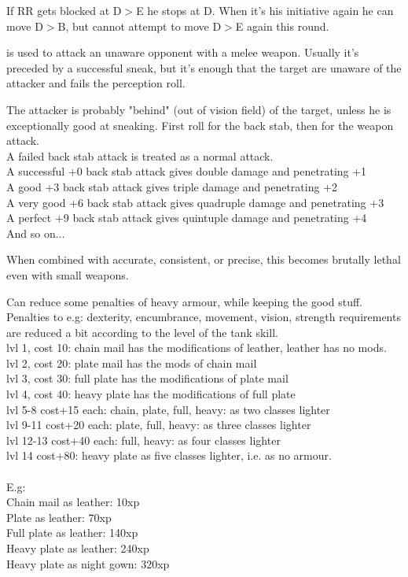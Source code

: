 If RR gets blocked at D$>$E he stops at D. When it's his initiative again he can move D$>$B, but cannot attempt to move D$>$E again this round.


 is used to attack an unaware opponent with a melee weapon. Usually it's preceded by a successful sneak, but it's enough that the target are unaware of the attacker and fails the perception roll.

The attacker is probably "behind" (out of vision field) of the target, unless he is exceptionally good at sneaking. First roll for the back stab, then for the weapon attack.\\ %
A failed back stab attack is treated as a normal attack.\\
A successful +0 back stab attack gives double damage and penetrating +1 \\
A good +3 back stab attack gives triple damage and penetrating +2 \\
A very good +6 back stab attack gives quadruple damage and penetrating +3 \\
A perfect +9 back stab attack gives quintuple damage and penetrating +4 \\
And so on...

When combined with accurate, consistent, or precise, this becomes brutally lethal even with small weapons.


 Can reduce some penalties of heavy armour, while keeping the good stuff. Penalties to e.g: dexterity, encumbrance, movement, vision, strength requirements are reduced a bit according to the level of the tank skill.\\
lvl 1, cost 10: chain mail has the modifications of leather, leather has no mods. \\
lvl 2, cost 20: plate mail has the mods of chain mail \\
lvl 3, cost 30: full plate has the modifications of plate mail \\
lvl 4, cost 40: heavy plate has the modifications of full plate \\
lvl 5-8 cost+15 each: chain, plate, full, heavy: as two classes lighter \\
lvl 9-11 cost+20 each: plate, full, heavy: as three classes lighter \\
lvl 12-13 cost+40 each: full, heavy: as four classes lighter \\
lvl 14 cost+80: heavy plate as five classes lighter, i.e. as no armour.\\
\\
E.g:\\
Chain mail as leather: 10xp\\
Plate as leather: 70xp\\          %
Full plate as leather: 140xp\\    %
Heavy plate as leather: 240xp\\   %
Heavy plate as night gown: 320xp

